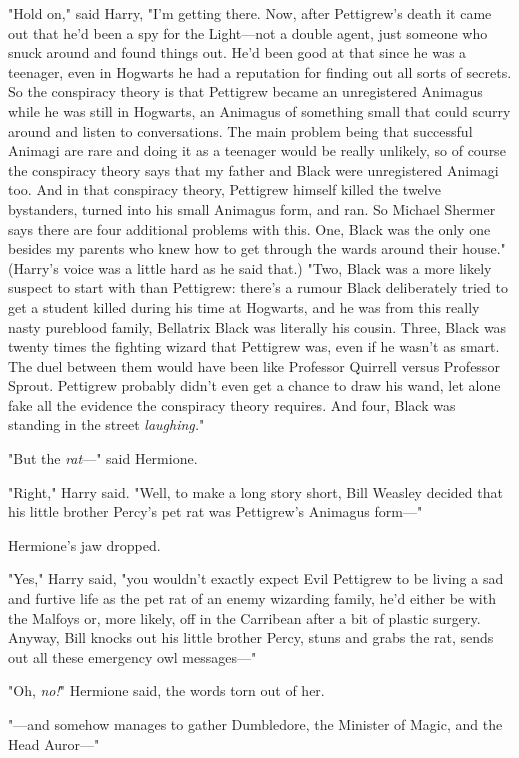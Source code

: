 "Hold on," said Harry, "I'm getting there. Now, after Pettigrew's death it came
out that he'd been a spy for the Light---not a double agent, just someone who
snuck around and found things out. He'd been good at that since he was a
teenager, even in Hogwarts he had a reputation for finding out all sorts of
secrets. So the conspiracy theory is that Pettigrew became an unregistered
Animagus while he was still in Hogwarts, an Animagus of something small that
could scurry around and listen to conversations. The main problem being that
successful Animagi are rare and doing it as a teenager would be really
unlikely, so of course the conspiracy theory says that my father and Black were
unregistered Animagi too. And in that conspiracy theory, Pettigrew himself
killed the twelve bystanders, turned into his small Animagus form, and ran. So
Michael Shermer says there are four additional problems with this. One, Black
was the only one besides my parents who knew how to get through the wards
around their house." (Harry's voice was a little hard as he said that.) "Two,
Black was a more likely suspect to start with than Pettigrew: there's a rumour
Black deliberately tried to get a student killed during his time at Hogwarts,
and he was from this really nasty pureblood family, Bellatrix Black was
literally his cousin. Three, Black was twenty times the fighting wizard that
Pettigrew was, even if he wasn't as smart. The duel between them would have
been like Professor Quirrell versus Professor Sprout. Pettigrew probably didn't
even get a chance to draw his wand, let alone fake all the evidence the
conspiracy theory requires. And four, Black was standing in the street
\emph{laughing.}"

"But the \emph{rat}---" said Hermione.

"Right," Harry said. "Well, to make a long story short, Bill Weasley decided
that his little brother Percy's pet rat was Pettigrew's Animagus form---"

Hermione's jaw dropped.

"Yes," Harry said, "you wouldn't exactly expect Evil Pettigrew to be living a
sad and furtive life as the pet rat of an enemy wizarding family, he'd either
be with the Malfoys or, more likely, off in the Carribean after a bit of
plastic surgery. Anyway, Bill knocks out his little brother Percy, stuns and
grabs the rat, sends out all these emergency owl messages---"

"Oh, \emph{no!}" Hermione said, the words torn out of her.

"---and somehow manages to gather Dumbledore, the Minister of Magic, and the
Head Auror---"

